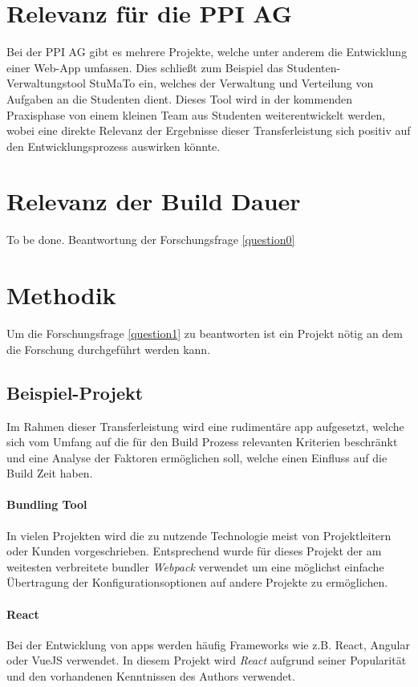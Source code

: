 \documentclass[11pt]{report}
\begin{document}
	    \pagebreak

		\section{Relevanz für die PPI AG}
			Bei der PPI AG gibt es mehrere Projekte, welche unter anderem die Entwicklung einer Web-App umfassen. Dies schließt zum Beispiel das Studenten-Verwaltungstool StuMaTo ein, welches der Verwaltung und Verteilung von Aufgaben an die Studenten dient. Dieses Tool wird in der kommenden Praxisphase von einem kleinen Team aus Studenten weiterentwickelt werden, wobei eine direkte Relevanz der Ergebnisse dieser Transferleistung sich positiv auf den Entwicklungsprozess auswirken könnte.
	
		\section{Relevanz der Build Dauer}
		 	To be done. Beantwortung der Forschungsfrage \ref{question0} %

		\section{Methodik}
			Um die Forschungsfrage \ref{question1} zu beantworten ist ein Projekt nötig an dem die Forschung durchgeführt werden kann.
			\subsection{Beispiel-Projekt}
				Im Rahmen dieser Transferleistung wird eine rudimentäre \Gls{app} aufgesetzt, welche sich vom Umfang auf die für den Build Prozess relevanten Kriterien beschränkt und eine Analyse der Faktoren ermöglichen soll, welche einen Einfluss auf die Build Zeit haben.

				\paragraph{Bundling Tool} In vielen Projekten wird die zu nutzende Technologie meist von Projektleitern oder Kunden vorgeschrieben. Entsprechend wurde für dieses Projekt der am weitesten verbreitete\cite{npmtrends:wab} \Gls{bundler} \emph{Webpack} verwendet um eine möglichst einfache Übertragung der Konfigurationsoptionen auf andere Projekte zu ermöglichen.

				\paragraph{React} Bei der Entwicklung von \Glspl{app} werden häufig Frameworks wie z.B. React, Angular oder VueJS verwendet. In diesem Projekt wird \emph{React} aufgrund seiner Popularität\cite{npmtrends:frameworks} und den vorhandenen Kenntnissen des Authors verwendet.
\end{document}
